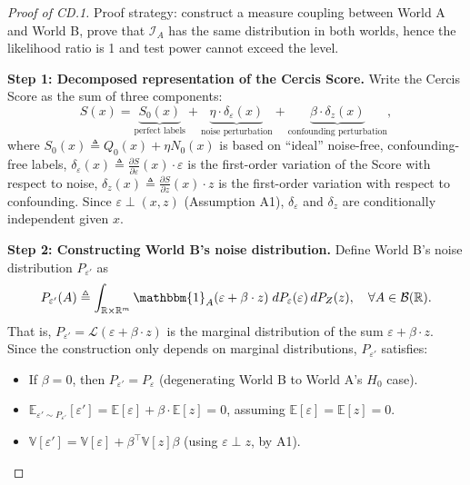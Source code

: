 \documentclass[12pt,a4paper]{article}
\newcommand{\R}{\mathbb{R}}
\newcommand{\E}{\mathbb{E}}
\newcommand{\V}{\mathbb{V}}
\newcommand{\cI}{\mathcal{I}}
\newcommand{\cB}{\mathcal{B}}
\newcommand{\Law}{\mathcal{L}}
\newcommand{\defeq}{\triangleq}
\begin{document}
\begin{proof}[Proof of CD.1]
Proof strategy: construct a measure coupling between World A and World B, prove that $\cI_A$ has the same distribution in both worlds, hence the likelihood ratio is 1 and test power cannot exceed the level.

\textbf{Step 1: Decomposed representation of the Cercis Score.}
Write the Cercis Score as the sum of three components:
\begin{equation}\label{eq:s-decomp-formal}
    S(x) = \underbrace{S_0(x)}_{\text{perfect labels}}
    + \underbrace{\eta \cdot \delta_\varepsilon(x)}_{\text{noise perturbation}}
    + \underbrace{\beta \cdot \delta_z(x)}_{\text{confounding perturbation}},
\end{equation}
where $S_0(x) \defeq Q_0(x) + \eta N_0(x)$ is based on ``ideal'' noise-free, confounding-free labels,
$\delta_\varepsilon(x) \defeq \frac{\partial S}{\partial \varepsilon}(x) \cdot \varepsilon$ is the first-order variation of the Score with respect to noise,
$\delta_z(x) \defeq \frac{\partial S}{\partial z}(x) \cdot z$ is the first-order variation with respect to confounding.
Since $\varepsilon \perp (x,z)$ (Assumption A1), $\delta_\varepsilon$ and $\delta_z$ are conditionally independent given $x$.

\textbf{Step 2: Constructing World B's noise distribution.}
Define World B's noise distribution $P_{\varepsilon'}$ as
\begin{equation}\label{eq:construct-pe}
    P_{\varepsilon'}(A) \defeq \int_{\R \times \R^m}
    \mathbbm{1}_A(\varepsilon + \beta\cdot z)\; dP_\varepsilon(\varepsilon)\, dP_Z(z),\quad
    \forall A \in \cB(\R).
\end{equation}
That is, $P_{\varepsilon'} = \Law(\varepsilon + \beta\cdot z)$ is the marginal distribution of the sum $\varepsilon + \beta\cdot z$.
Since the construction only depends on marginal distributions, $P_{\varepsilon'}$ satisfies:
\begin{itemize}
    \item If $\beta = 0$, then $P_{\varepsilon'} = P_\varepsilon$ (degenerating World B to World A's $H_0$ case).
    \item $\E_{\varepsilon'\sim P_{\varepsilon'}}[\varepsilon'] = \E[\varepsilon] + \beta\cdot\E[z] = 0$, assuming $\E[\varepsilon] = \E[z] = 0$.
    \item $\V[\varepsilon'] = \V[\varepsilon] + \beta^\top \V[z]\beta$ (using $\varepsilon \perp z$, by A1).
\end{itemize}


\end{proof}
\end{document}
